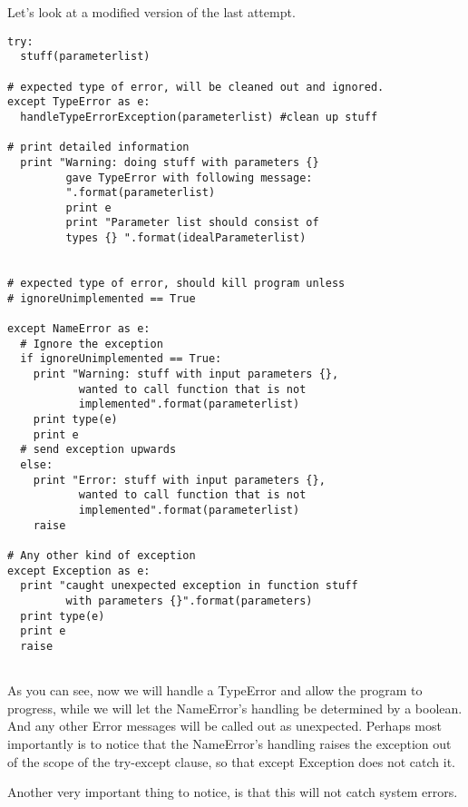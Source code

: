 \documentclass[10pt,a4paper]{article}
\begin{document}
Let's look at a modified version of the last attempt.

\begin{lstlisting}
try: 
  stuff(parameterlist)
  
# expected type of error, will be cleaned out and ignored.
except TypeError as e:
  handleTypeErrorException(parameterlist) #clean up stuff
  
# print detailed information
  print "Warning: doing stuff with parameters {} 
         gave TypeError with following message:
         ".format(parameterlist)
         print e 
         print "Parameter list should consist of 
         types {} ".format(idealParameterlist)


# expected type of error, should kill program unless 
# ignoreUnimplemented == True
         
except NameError as e: 
  # Ignore the exception
  if ignoreUnimplemented == True:
    print "Warning: stuff with input parameters {}, 
           wanted to call function that is not 
           implemented".format(parameterlist)
    print type(e)
    print e
  # send exception upwards
  else:
    print "Error: stuff with input parameters {}, 
           wanted to call function that is not 
           implemented".format(parameterlist)  
    raise

# Any other kind of exception
except Exception as e:
  print "caught unexpected exception in function stuff
         with parameters {}".format(parameters)
  print type(e)
  print e
  raise
  
\end{lstlisting}

As you can see, now we will handle a TypeError and allow the program to progress, while we will let the NameError's handling be determined by a boolean. And any other Error messages will be called out as unexpected. Perhaps most importantly is to notice that the NameError's handling raises the exception out of the scope of the try-except clause, so that except Exception does not catch it.

Another very important thing to notice, is that this will not catch system errors. 

\end{document}
